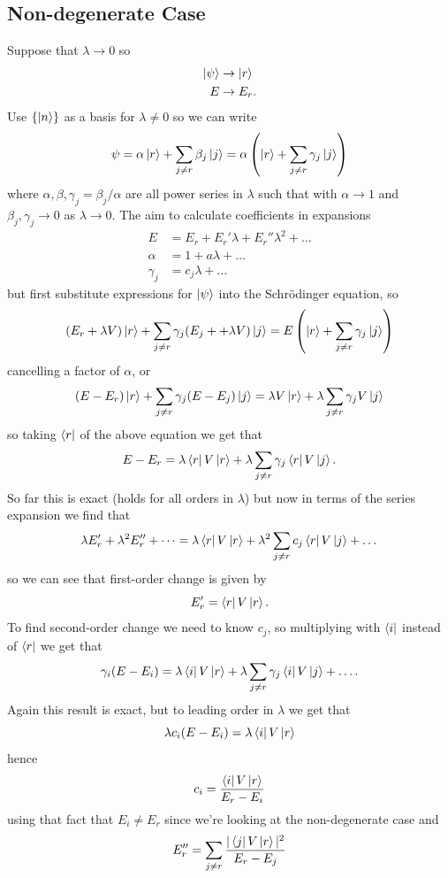 \documentclass{article}
\begin{document}
\subsection{Non-degenerate Case}
Suppose that $ \lambda \to 0 $ so
\begin{align*}
	\ket \psi &\to \ket r  \\
	E & \to E_r.
\end{align*}
Use $ \{\ket n\} $ as a basis for $ \lambda \ne 0  $ so we can write
\[
	\psi = \alpha\ket r + \sum_{j\ne r} \beta_j \ket j = \alpha\left(\ket r + \sum_{j\ne r} \gamma_j \ket j\right)
\]
where $ \alpha,\beta,\gamma_j = \beta_j/\alpha $ are all power series in $ \lambda $ such that with $ \alpha \to 1 $ and $ \beta_j,\gamma_j\to 0 $ as $ \lambda \to 0 $. The aim to calculate coefficients in expansions
\begin{align*}
	E &= E_r + E_r' \lambda +E_r''\lambda^2 +\dots \\
	\alpha &= 1 + a \lambda + \dots \\
	\gamma_j &= c_j\lambda +\dots
\end{align*}
but first substitute expressions for $ \ket\psi $ into the Schr\"odinger equation, so
\begin{align*}
	(E_r + \lambda V) \ket r + \sum_{j\ne r} \gamma_j(E_j + + \lambda V) \ket j  = E\left( \ket r  + \sum_{j\ne r}\gamma_j \ket j\right) 
\end{align*}
cancelling a factor of $ \alpha $, or 
\[
(E-E_r) \ket r+ \sum_{j\ne r} \gamma_j (E-E_j) \ket j =\lambda V\ket r + \lambda \sum_{j\ne r} \gamma_j V \ket j
\]
so taking $ \bra r $ of the above equation we get that
\[
	E-E_r = \lambda \bra{r}V\ket{r} + \lambda \sum_{j\ne r} \gamma_j \bra{r}V\ket{j}.
\]
So far this is exact (holds for all orders in $ \lambda $) but now in terms of the series expansion we find that
\[
	\lambda E_r' + \lambda^2 E_r'' + \dots = \lambda \bra{r}V\ket{r} + \lambda^2 \sum_{j\ne r} c_j \bra{r}V\ket{j} + \dots
\]
so we can see that first-order change is given by
\[
	E_r' = \bra{r}V\ket{r}.
\]
To find second-order change we need to know $ c_j $, so multiplying with $ \bra i $ instead of $ \bra r $ we get that
\[
	\gamma_i (E-E_i) = \lambda \bra i V \ket r + \lambda \sum_{j\ne r} \gamma_j \bra i V\ket j+ \dots.
\]
Again this result is exact, but to leading order in $ \lambda  $ we get that
\[
  \lambda c_i(E-E_i) = \lambda \bra i V \ket r
\]
hence
\[
	c_i = \frac{\bra i V \ket r}{E_r-E_i}
\]
using that fact that $ E_i\ne E_r $ since we're looking at the non-degenerate case and 
\[
	E_r'' = \sum_{j\ne r} \frac{|\bra j V\ket r|^2}{E_r - E_j}
\]
\end{document}

